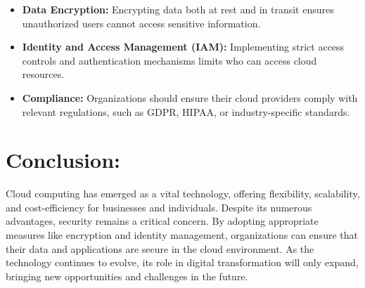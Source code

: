 \documentclass[14pt]{article}
\begin{document}
\begin{itemize}
    \item \textbf{Data Encryption:} Encrypting data both at rest and in transit ensures unauthorized users cannot access sensitive information.
    \item \textbf{Identity and Access Management (IAM):} Implementing strict access controls and authentication mechanisms limits who can access cloud resources.
    \item \textbf{Compliance:} Organizations should ensure their cloud providers comply with relevant regulations, such as GDPR, HIPAA, or industry-specific standards.
\end{itemize}

\section{Conclusion:}
Cloud computing has emerged as a vital technology, offering flexibility, scalability, and cost-efficiency for businesses and individuals. Despite its numerous advantages, security remains a critical concern. By adopting appropriate measures like encryption and identity management, organizations can ensure that their data and applications are secure in the cloud environment. As the technology continues to evolve, its role in digital transformation will only expand, bringing new opportunities and challenges in the future.
\end{document}
